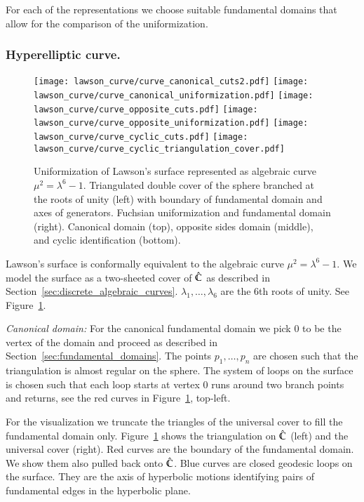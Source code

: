 \documentclass[Thesis.tex]{subfiles}
\begin{document}
For each of the representations we choose suitable fundamental domains that allow for the comparison of the uniformization.

\subsubsection{Hyperelliptic curve.}
\label{sec:lawson_curve}

\begin{figure}
	\centering
	\resizebox{!}{6cm} {
	\texttt{[image: lawson\_curve/curve\_canonical\_cuts2.pdf]}
	\texttt{[image: lawson\_curve/curve\_canonical\_uniformization.pdf]}
	}
	\resizebox{!}{6cm} {
	\texttt{[image: lawson\_curve/curve\_opposite\_cuts.pdf]}
	\texttt{[image: lawson\_curve/curve\_opposite\_uniformization.pdf]}
	}
	\resizebox{!}{6cm} {
	\texttt{[image: lawson\_curve/curve\_cyclic\_cuts.pdf]}
	\texttt{[image: lawson\_curve/curve\_cyclic\_triangulation\_cover.pdf]}
	}
	\caption{Uniformization of Lawson's surface represented as algebraic curve $\mu^2=\lambda^6-1$. Triangulated double cover of the sphere branched at the roots of unity (left) with boundary of fundamental domain and axes of generators. Fuchsian uniformization and fundamental domain (right). Canonical domain (top), opposite sides domain (middle), and cyclic identification (bottom).}
	\label{fig:lawson_curve}
\end{figure}

Lawson's surface is conformally equivalent to the algebraic curve $\mu^2=\lambda^6-1$.
We model the surface as a two-sheeted cover of $\hat {\mathbb C}$ as described in Section~\ref{sec:discrete_algebraic_curves}. $\lambda_1,\ldots,\lambda_6$ are the 6th roots of unity.
See Figure~\ref{fig:lawson_curve}.

\textit{Canonical domain:}
For the canonical fundamental domain we pick $0$ to be the vertex of the domain and proceed as described in Section~\ref{sec:fundamental_domains}.
The points $p_1,\ldots,p_n$ are chosen such that the triangulation is almost regular on the sphere.
The system of loops on the surface is chosen such that each loop starts at vertex $0$ runs around two branch points and returns, see the red curves in Figure~\ref{fig:lawson_curve}, top-left.

For the visualization we truncate the triangles of the universal cover to fill the fundamental domain only.
Figure~\ref{fig:lawson_curve} shows the triangulation on $\hat {\mathbb C}$ (left) and the universal cover (right).
Red curves are the boundary of the fundamental domain.
We show them also pulled back onto $\hat {\mathbb C}$. Blue curves are closed geodesic loops on the surface.
They are the axis of hyperbolic motions identifying pairs of fundamental edges in the hyperbolic plane.
\end{document}

